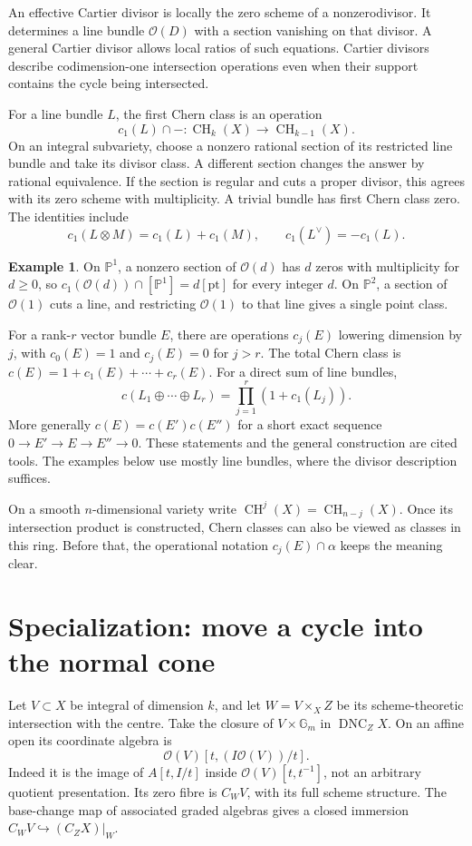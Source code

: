\documentclass[11pt,a4paper]{article}
\numberwithin{equation}{section}
\theoremstyle{definition}
\newtheorem{example}[definition]{Example}
\newcommand{\PP}{\mathbb P}
\newcommand{\Gm}{\mathbb G_m}
\newcommand{\OO}{\mathcal O}
\newcommand{\CH}{\operatorname{CH}}
\newcommand{\Dnc}{\operatorname{DNC}}
\newcommand{\source}[1]{\par\smallskip{\small\textit{Reference.} #1}\par}
\begin{document}
An effective Cartier divisor is locally the zero scheme of a
nonzerodivisor. It determines a line bundle $\OO(D)$ with a section
vanishing on that divisor. A general Cartier divisor allows local
ratios of such equations. Cartier divisors describe codimension-one
intersection operations even when their support contains the cycle
being intersected.

For a line bundle $L$, the first Chern class is an operation
\[
c_1(L)\cap-:\CH_k(X)\longrightarrow\CH_{k-1}(X).
\]
On an integral subvariety, choose a nonzero rational section of its
restricted line bundle and take its divisor class. A different
section changes the answer by rational equivalence. If the section
is regular and cuts a proper divisor, this agrees with its zero
scheme with multiplicity. A trivial bundle has first Chern class
zero. The identities include
\[
c_1(L\otimes M)=c_1(L)+c_1(M),\qquad
c_1(L^\vee)=-c_1(L).
\]

\begin{example}
On $\PP^1$, a nonzero section of $\OO(d)$ has $d$ zeros with
multiplicity for $d\ge0$, so
$c_1(\OO(d))\cap[\PP^1]=d[\mathrm{pt}]$ for every integer $d$.
On $\PP^2$, a section of $\OO(1)$ cuts a line, and restricting
$\OO(1)$ to that line gives a single point class.
\end{example}

For a rank-$r$ vector bundle $E$, there are operations $c_j(E)$
lowering dimension by $j$, with $c_0(E)=1$ and $c_j(E)=0$ for $j>r$.
The total Chern class is $c(E)=1+c_1(E)+\cdots+c_r(E)$. For a direct
sum of line bundles,
\[
c(L_1\oplus\cdots\oplus L_r)=\prod_{j=1}^r(1+c_1(L_j)).
\]
More generally $c(E)=c(E')c(E'')$ for a short exact sequence
$0\to E'\to E\to E''\to0$. These statements and the general
construction are cited tools. The examples below use mostly line
bundles, where the divisor description suffices.

On a smooth $n$-dimensional variety write $\CH^j(X)=\CH_{n-j}(X)$.
Once its intersection product is constructed, Chern classes can also
be viewed as classes in this ring. Before that, the operational
notation $c_j(E)\cap\alpha$ keeps the meaning clear.
\source{Fulton~\cite{FIntro}, \S3.4 and \S4.1.}

\section{Specialization: move a cycle into the normal cone}
\label{sec:specialization}

Let $V\subset X$ be integral of dimension $k$, and let $W=V\times_X Z$
be its scheme-theoretic intersection with the centre. Take the closure
of $V\times\Gm$ in $\Dnc_ZX$. On an affine open its coordinate algebra
is
\[
\OO(V)[t,(I\OO(V))/t].
\]
Indeed it is the image of $A[t,I/t]$ inside
$\OO(V)[t,t^{-1}]$, not an arbitrary quotient presentation. Its zero
fibre is $C_WV$, with its full scheme structure. The base-change map
of associated graded algebras gives a closed immersion
$C_WV\hookrightarrow(C_ZX)|_W$.
\end{document}
